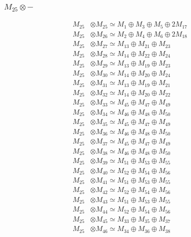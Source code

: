 \subsubsection{$ M_{25}\otimes -$}
\begin{align*}
M_{25} &\otimes M_{25} \simeq M_{1} \oplus M_{3} \oplus M_{5} \oplus 2M_{17} \\
M_{25} &\otimes M_{26} \simeq M_{2} \oplus M_{4} \oplus M_{6} \oplus 2M_{18} \\
M_{25} &\otimes M_{27} \simeq M_{13} \oplus M_{21} \oplus M_{23} \\
M_{25} &\otimes M_{28} \simeq M_{14} \oplus M_{22} \oplus M_{24} \\
M_{25} &\otimes M_{29} \simeq M_{13} \oplus M_{19} \oplus M_{23} \\
M_{25} &\otimes M_{30} \simeq M_{14} \oplus M_{20} \oplus M_{24} \\
M_{25} &\otimes M_{31} \simeq M_{13} \oplus M_{19} \oplus M_{21} \\
M_{25} &\otimes M_{32} \simeq M_{14} \oplus M_{20} \oplus M_{22} \\
M_{25} &\otimes M_{33} \simeq M_{45} \oplus M_{47} \oplus M_{49} \\
M_{25} &\otimes M_{34} \simeq M_{46} \oplus M_{48} \oplus M_{50} \\
M_{25} &\otimes M_{35} \simeq M_{45} \oplus M_{47} \oplus M_{49} \\
M_{25} &\otimes M_{36} \simeq M_{46} \oplus M_{48} \oplus M_{50} \\
M_{25} &\otimes M_{37} \simeq M_{45} \oplus M_{47} \oplus M_{49} \\
M_{25} &\otimes M_{38} \simeq M_{46} \oplus M_{48} \oplus M_{50} \\
M_{25} &\otimes M_{39} \simeq M_{51} \oplus M_{53} \oplus M_{55} \\
M_{25} &\otimes M_{40} \simeq M_{52} \oplus M_{54} \oplus M_{56} \\
M_{25} &\otimes M_{41} \simeq M_{51} \oplus M_{53} \oplus M_{55} \\
M_{25} &\otimes M_{42} \simeq M_{52} \oplus M_{54} \oplus M_{56} \\
M_{25} &\otimes M_{43} \simeq M_{51} \oplus M_{53} \oplus M_{55} \\
M_{25} &\otimes M_{44} \simeq M_{52} \oplus M_{54} \oplus M_{56} \\
M_{25} &\otimes M_{45} \simeq M_{33} \oplus M_{35} \oplus M_{37} \\
M_{25} &\otimes M_{46} \simeq M_{34} \oplus M_{36} \oplus M_{38} \\

\end{align*}
